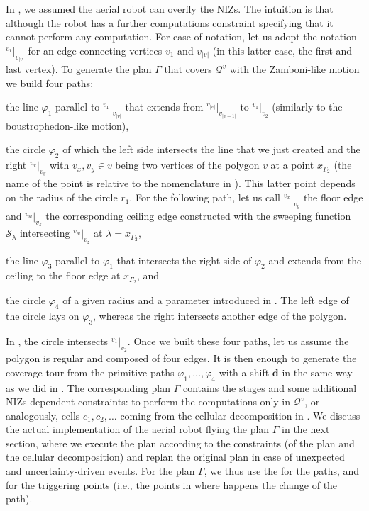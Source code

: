In , we assumed the aerial robot can overfly the NIZs. The intuition is that although the robot has a further computations constraint specifying that it cannot perform any computation. For ease of notation, let us adopt the notation ${}^{v_1}|_{v_{|v|}}$ for an edge connecting vertices $v_1$ and $v_{|v|}$ (in this latter case, the first and last vertex). To generate the plan $\Gamma$ that covers $\mathcal{Q}^v$ with the Zamboni-like motion we build four paths:
\begin{enumerate*}[label={(\alph*)},font={\textit}]
  \item the line $\varphi_1$ parallel to ${}^{v_1}|_{v_{|v|}}$ that extends from ${}^{v_{|v|}}|_{v_{|v-1|}}$ to ${}^{v_{1}}|_{v_{2}}$ (similarly to the boustrophedon-like motion),
  \item the circle $\varphi_2$ of which the left side intersects the line that we just created and the right ${}^{v_x}|_{v_y}$ with $v_x,v_y\in v$ being two vertices of the polygon $v$ at a point $x_{\Gamma_2}$ (the name of the point is relative to the nomenclature in ). This latter point depends on the radius of the circle $r_1$. For the following path, let us call ${}^{v_x}|_{v_y}$ the floor edge and ${}^{v_w}|_{v_z}$ the corresponding ceiling edge constructed with the sweeping function $\mathcal{S}_{\lambda}$ intersecting  ${}^{v_w}|_{v_z}$ at $\lambda=x_{\Gamma_2}$,
  \item the line $\varphi_3$ parallel to $\varphi_1$ that intersects the right side of $\varphi_2$ and extends from the ceiling to the floor edge at $x_{\Gamma_2}$, and
  \item the circle $\varphi_4$ of a given radius and a parameter introduced in . The left edge of the circle lays on $\varphi_3$, whereas the right intersects another edge of the polygon. 
\end{enumerate*}
In , the circle intersects ${}^{v_1}|_{v_2}$. Once we built these four paths, let us assume the polygon is regular and composed of four edges. It is then enough to generate the coverage tour from the primitive paths $\varphi_1,\dots,\varphi_4$ with a shift $\mathbf{d}$ in the same way as we did in . The corresponding plan $\Gamma$ contains the stages and some additional NIZs dependent constraints: to perform the computations only in $\mathcal{Q}^v$, or analogously, cells $c_1,c_2,\dots$ coming from the cellular decomposition in . We discuss the actual implementation of the aerial robot flying the plan $\Gamma$ in the next section, where we execute the plan according to the constraints (of the plan and the cellular decomposition) and replan the original plan in case of unexpected and uncertainty-driven events. For the plan $\Gamma$, we thus use the  for the paths, and  for the triggering points (i.e., the points in  where happens the change of the path).

